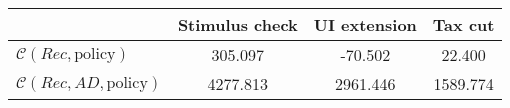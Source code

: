 \begin{tabular}{@{}lccc@{}} 
\toprule 
                          & Stimulus check      & UI extension    & Tax cut    \\  \midrule 
$\mathcal{C}(Rec,\text{policy})$ & 305.097  & -70.502  & 22.400     \\ 
$\mathcal{C}(Rec, AD,\text{policy})$ & 4277.813  & 2961.446  & 1589.774     \\ 
\end{tabular}  
